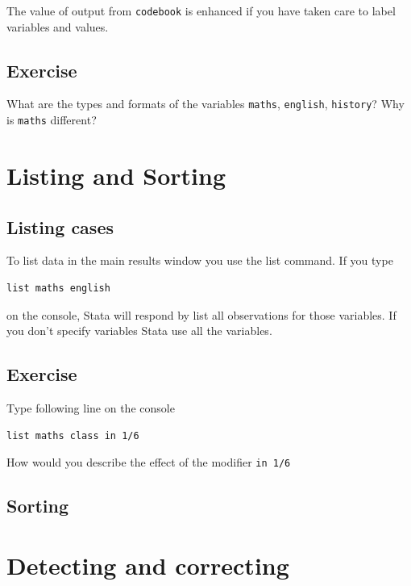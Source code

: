 \documentclass[
]{article}
\begin{document}
The value of output from \texttt{codebook} is enhanced if you have taken care to label variables and values.

\hypertarget{exercise-3}{%
\subsection{Exercise}\label{exercise-3}}

What are the types and formats of the variables \texttt{maths}, \texttt{english}, \texttt{history}? Why is \texttt{maths} different?

\hypertarget{listing-and-sorting}{%
\section{Listing and Sorting}\label{listing-and-sorting}}

\hypertarget{listing-cases}{%
\subsection{Listing cases}\label{listing-cases}}

To list data in the main results window you use the list command. If you type

\begin{verbatim}
list maths english
\end{verbatim}

on the console, Stata will respond by list all observations for those variables. If you don't specify variables Stata use all the variables.

\hypertarget{exercise-4}{%
\subsection{Exercise}\label{exercise-4}}

Type following line on the console

\begin{verbatim}
list maths class in 1/6
\end{verbatim}

How would you describe the effect of the modifier \texttt{in\ 1/6}

\hypertarget{sorting}{%
\subsection{Sorting}\label{sorting}}

\hypertarget{detecting-and-correcting}{%
\section{Detecting and correcting}\label{detecting-and-correcting}}
\end{document}
